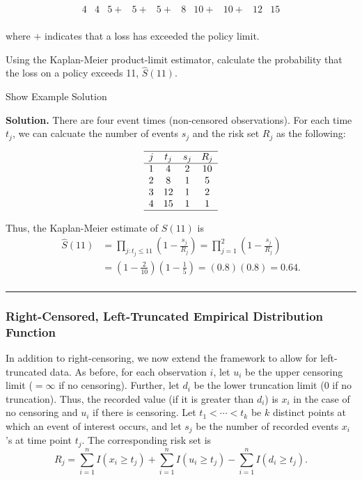 \documentclass[]{book}
\theoremstyle{definition}
\theoremstyle{definition}
\theoremstyle{definition}
\theoremstyle{remark}
\begin{document}
\[\begin{array}{cccccccccc}
4 &4 &5+ &5+ &5+ &8 &10+ &10+ &12 &15 \\
\end{array}\]

where \(+\) indicates that a loss has exceeded the policy limit.

Using the Kaplan-Meier product-limit estimator, calculate the
probability that the loss on a policy exceeds 11, \(\hat{S}(11)\).

Show Example Solution

\hypertarget{toggleExampleSelect.3.5}{}
\textbf{Solution.} There are four event times (non-censored
observations). For each time \(t_j\), we can calcuate the number of
events \(s_j\) and the risk set \(R_j\) as the following:

\[\begin{array}{cccc}
\hline
j & t_j & s_j & R_j \\
\hline
1 & 4 & 2 & 10 \\
2 & 8 & 1 & 5 \\
3 & 12 & 1 & 2 \\
4 & 15 & 1 & 1 \\
\hline
\end{array}\]

Thus, the Kaplan-Meier estimate of \(S(11)\) is \[\begin{aligned}
\hat{S}(11) &= \prod_{j:t_j\leq 11} \left( 1- \frac{s_j}{R_j} \right) =  \prod_{j=1}^{2} \left( 1- \frac{s_j}{R_j} \right)\\
&= \left(1-\frac{2}{10} \right) \left(1-\frac{1}{5} \right) = (0.8)(0.8)= 0.64. \\
\end{aligned}\]

\begin{center}\rule{0.5\linewidth}{\linethickness}\end{center}

\subsubsection{Right-Censored, Left-Truncated Empirical Distribution
Function}\label{right-censored-left-truncated-empirical-distribution-function}

In addition to right-censoring, we now extend the framework to allow for
left-truncated data. As before, for each observation \(i\), let \(u_i\)
be the upper censoring limit (\(=\infty\) if no censoring). Further, let
\(d_i\) be the lower truncation limit (0 if no truncation). Thus, the
recorded value (if it is greater than \(d_i\)) is \(x_i\) in the case of
no censoring and \(u_i\) if there is censoring. Let
\(t_{1} <\cdots< t_{k}\) be \(k\) distinct points at which an event of
interest occurs, and let \(s_j\) be the number of recorded events
\(x_i\)'s at time point \(t_{j}\). The corresponding risk set is
\[R_j = \sum_{i=1}^n I(x_i \geq t_{j}) + \sum_{i=1}^n I(u_i \geq t_{j}) - \sum_{i=1}^n I(d_i \geq t_{j}).\]
\end{document}
